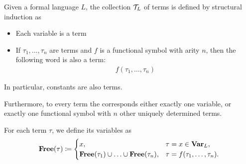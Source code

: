 \begin{definition}\label{def:first_order_term}\cite[20]{Lectures:logic_programming}
  Given a formal language $L$, the collection $\mathcal T_L$ of terms is defined by structural induction as
  \begin{itemize}
    \item Each variable is a term
    \item If $\tau_1, \ldots, \tau_n$ are terms and $f$ is a functional symbol with arity $n$, then the following word is also a term:
    \begin{align*}
      f(\tau_1, \ldots, \tau_n)
    \end{align*}
  \end{itemize}

  In particular, constants are also terms.

  Furthermore, to every term the corresponds either exactly one variable, or exactly one functional symbol with $n$ other uniquely determined terms.

  For each term $\tau$, we define its variables as
  \begin{align*}
    \operatorname{\mathbf{Free}}(\tau) \coloneqq \begin{cases}
      x,                                                        &\tau = x \in \operatorname{\mathbf{Var}}_L, \\
      \operatorname{\mathbf{Free}}(\tau_1) \cup \ldots \cup \operatorname{\mathbf{Free}}(\tau_n), &\tau = f(\tau_1, \ldots, \tau_n).
    \end{cases}
  \end{align*}
\end{definition}

